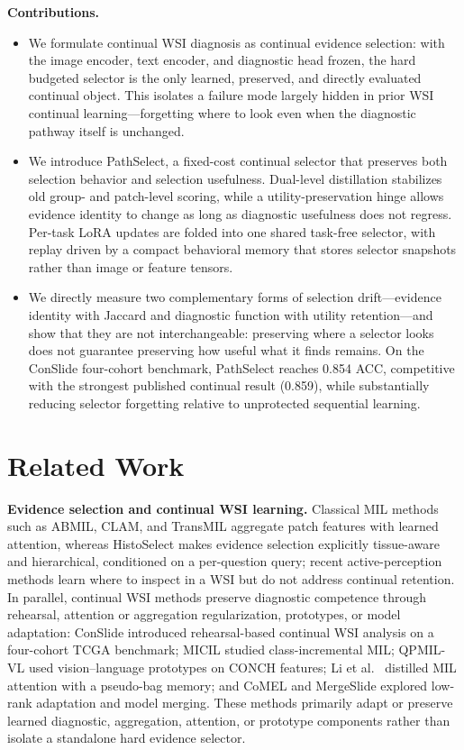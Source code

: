 \documentclass{article}
\begin{document}
\textbf{Contributions.}
\begin{itemize}
    \item We formulate continual WSI diagnosis as continual evidence selection: with the image encoder, text encoder, and diagnostic head frozen, the hard budgeted selector is the only learned, preserved, and directly evaluated continual object. This isolates a failure mode largely hidden in prior WSI continual learning---forgetting where to look even when the diagnostic pathway itself is unchanged.
    \item We introduce PathSelect, a fixed-cost continual selector that preserves both selection behavior and selection usefulness. Dual-level distillation stabilizes old group- and patch-level scoring, while a utility-preservation hinge allows evidence identity to change as long as diagnostic usefulness does not regress. Per-task LoRA updates are folded into one shared task-free selector, with replay driven by a compact behavioral memory that stores selector snapshots rather than image or feature tensors.
    \item We directly measure two complementary forms of selection drift---evidence identity with Jaccard and diagnostic function with utility retention---and show that they are not interchangeable: preserving where a selector looks does not guarantee preserving how useful what it finds remains. On the ConSlide four-cohort benchmark, PathSelect reaches 0.854 ACC, competitive with the strongest published continual result (0.859), while substantially reducing selector forgetting relative to unprotected sequential learning.
\end{itemize}

\section{Related Work}
\label{sec:related}

\textbf{Evidence selection and continual WSI learning.}
Classical MIL methods such as ABMIL, CLAM, and TransMIL \cite{ilse2018abmil,lu2021clam,shao2021transmil} aggregate patch features with learned attention, whereas HistoSelect \cite{huang2026histoselect} makes evidence selection explicitly tissue-aware and hierarchical, conditioned on a per-question query; recent active-perception methods learn where to inspect in a WSI \cite{chen2026adaptivepath} but do not address continual retention. In parallel, continual WSI methods preserve diagnostic competence through rehearsal, attention or aggregation regularization, prototypes, or model adaptation: ConSlide \cite{huang2023conslide} introduced rehearsal-based continual WSI analysis on a four-cohort TCGA benchmark; MICIL \cite{meseguer2024micil} studied class-incremental MIL; QPMIL-VL \cite{gou2025qpmil} used vision--language prototypes on CONCH features; Li et al.\ \cite{li2025akd} distilled MIL attention with a pseudo-bag memory; and CoMEL \cite{lee2025comel} and MergeSlide \cite{bui2026mergeslide} explored low-rank adaptation and model merging. These methods primarily adapt or preserve learned diagnostic, aggregation, attention, or prototype components rather than isolate a standalone hard evidence selector.
\end{document}
